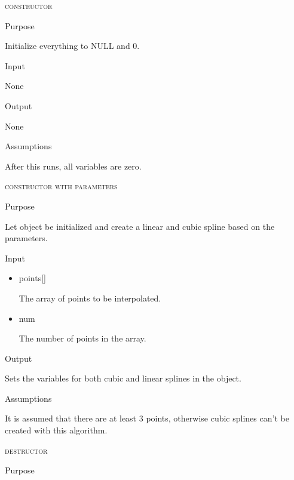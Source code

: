 \documentclass[pdftex, 11pt]{article}
\begin{document}
\begin{description}
	\item{\textsc{constructor}}
		\begin{description}
			\item{Purpose}

				Initialize everything to NULL and 0.

			\item{Input}

				None

			\item{Output}

				None

			\item{Assumptions}

				After this runs, all variables are zero.

		\end{description}


	\item{\textsc{constructor with parameters}}
		\begin{description}
			\item{Purpose}

				Let object be initialized and create a linear and cubic spline based
				on the parameters.

			\item{Input}

				\begin{itemize}

					\item{points[]}

						The array of points to be interpolated.

					\item{num}

						The number of points in the array.

				\end{itemize}

			\item{Output}
			
				Sets the variables for both cubic and linear splines in the object.

			\item{Assumptions}

				It is assumed that there are at least 3 points, otherwise cubic splines can't
				be created with this algorithm.

		\end{description}


	\item{\textsc{destructor}}
		\begin{description}
			\item{Purpose}


\end{description}
\end{description}
\end{document}
